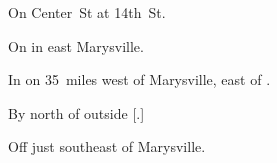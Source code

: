 
\begin{LocationList}

On  Center~St at 14th~St.

On  in east Marysville.

In  on  35~miles west of Marysville, east of .

\Location{\TruckStop \Gas \Rest}
By  north of  outside [.]

Off  just southeast of Marysville.

\end{LocationList}
